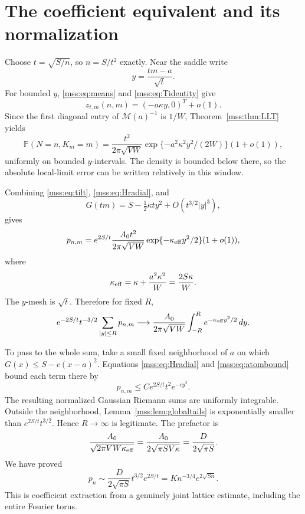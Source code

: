 \documentclass[11pt,letterpaper]{article}
\numberwithin{equation}{section}
\theoremstyle{definition}\newtheorem{definition}[theorem]{Definition}
\theoremstyle{remark}\newtheorem{remark}[theorem]{Remark}
\newcommand{\Prob}{\mathbb P}
\begin{document}
\section{The coefficient equivalent and its normalization}\label{mss:sec:leading}
Choose $t=\sqrt{S/n}$, so $n=S/t^2$ exactly. Near the saddle write
\begin{equation}\label{mss:eq:y}
y=\frac{tm-a}{\sqrt t}.
\end{equation}
For bounded $y$, \eqref{mss:eq:means} and \eqref{mss:eq:Tidentity} give
\begin{equation}\label{mss:eq:target}
z_{t,m}(n,m)=(-a\kappa y,0)^T+o(1).
\end{equation}
Since the first diagonal entry of $\mathcal M(a)^{-1}$ is $1/W$, Theorem~\ref{mss:thm:LLT} yields
\begin{equation}\label{mss:eq:jointcentral}
\Prob(N=n,K_m=m)
=\frac{t^2}{2\pi\sqrt{VW}}
\exp\{-a^2\kappa^2y^2/(2W)\}(1+o(1)),
\end{equation}
uniformly on bounded $y$-intervals. The density is bounded below there, so the absolute local-limit error can be written relatively in this window.

Combining \eqref{mss:eq:tilt}, \eqref{mss:eq:Hradial}, and
\[
G(tm)=S-\tfrac12\kappa t y^2+O(t^{3/2}|y|^3),
\]
gives
\begin{equation}\label{mss:eq:fixedminasymp}
p_{n,m}=e^{2S/t}\frac{A_0t^2}{2\pi\sqrt{VW}}
\exp\{-\kappa_{\rm eff}y^2/2\}(1+o(1)),
\end{equation}
where
\begin{equation}\label{mss:eq:keff}
\kappa_{\rm eff}=\kappa+\frac{a^2\kappa^2}{W}
=\frac{2S\kappa}{W}.
\end{equation}
The $y$-mesh is $\sqrt t$. Therefore for fixed $R$,
\[
e^{-2S/t}t^{-3/2}\sum_{|y|\le R}p_{n,m}
\longrightarrow\frac{A_0}{2\pi\sqrt{VW}}
\int_{-R}^{R}e^{-\kappa_{\rm eff}y^2/2}\,dy.
\]

To pass to the whole sum, take a small fixed neighborhood of $a$ on which $G(x)\le S-c(x-a)^2$. Equations \eqref{mss:eq:Hradial} and \eqref{mss:eq:atombound} bound each term there by
\begin{equation}\label{mss:eq:domination}
p_{n,m}\le C e^{2S/t}t^2e^{-c y^2}.
\end{equation}
The resulting normalized Gaussian Riemann sums are uniformly integrable. Outside the neighborhood, Lemma~\ref{mss:lem:globaltails} is exponentially smaller than $e^{2S/t}t^{3/2}$. Hence $R\to\infty$ is legitimate. The prefactor is
\begin{equation}\label{mss:eq:normalization}
\frac{A_0}{\sqrt{2\pi VW\kappa_{\rm eff}}}
=\frac{A_0}{2\sqrt{\pi S V\kappa}}
=\frac{D}{2\sqrt{\pi S}}.
\end{equation}
We have proved
\begin{equation}\label{mss:eq:leadingproved}
p_n\sim\frac{D}{2\sqrt{\pi S}}t^{3/2}e^{2S/t}
=K n^{-3/4}e^{2\sqrt{Sn}}.
\end{equation}
This is coefficient extraction from a genuinely joint lattice estimate, including the entire Fourier torus.
\end{document}
